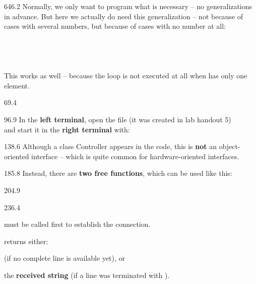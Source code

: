 \documentclass{aslab}
\newcommand*\indentcode[2]{\codearg{\hspace*{#1em}#2}}
\begin{document}
\begin{region}[x=74.7,right=0,pitch=13.2]{646.2}
Normally, we only want to program what is necessary -- no generalizations in
advance. But here we actually do need this generalization -- not because of
cases with several numbers, but because of cases with no number at all:\\
\tcode{>>> }\\
\tcode{>>> }\\
\tcode{>>> }\\
\indentcode{2.4}{l[i] = int(l[i])}\\
This works as well -- because the loop is not executed at all when 
has only one element.
\end{region}

\nextpage
\begin{region}{69.4}
\end{region}

\begin{region}[pitch=14.3]{96.9}
In the \textbf{left terminal}, open the file  (it was
created in lab handout 5)\\
and start it in the \textbf{right terminal} with: 
\end{region}

\begin{region}[pitch=14.3]{138.6}
Although a class Controller appears in the code, this is \textbf{not} an
object-oriented interface -- which is quite common for hardware-oriented
interfaces.
\end{region}

\begin{region}{185.8}
Instead, there are \textbf{two free functions}, which can be used like this:
\end{region}

\begin{region}[pitch=13.2]{204.9}
\\
\end{region}

\begin{region}[pitch=13.63]{236.4}
\begin{dashlist}
\item {} must be called first to establish the connection.
\item {} returns either:
  \begin{dashlist}
  \item {} (if no complete line is available yet), or
  \item the \textbf{received string} (if a line was terminated with
    \code{\n}).
  \end{dashlist}
\end{dashlist}
\end{region}
\end{document}
